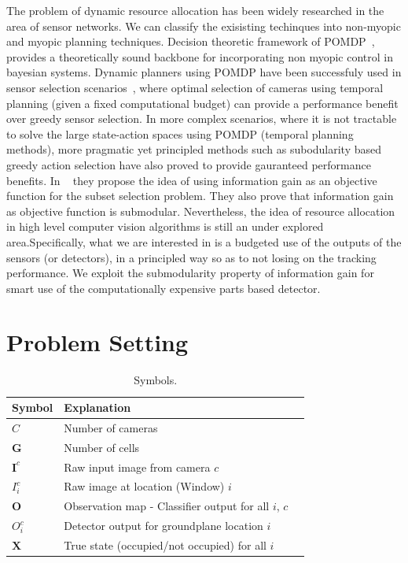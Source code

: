 \documentclass[10pt,twocolumn,letterpaper]{article}
\begin{document}
The problem of dynamic resource allocation has been widely researched in the area of sensor networks. We can classify the exisisting techinques into non-myopic and myopic planning techniques.  Decision theoretic framework of POMDP~\cite{Kaelbling98}, provides a theoretically sound backbone for incorporating non myopic control in bayesian systems. Dynamic planners using POMDP have been successfuly used in sensor selection scenarios~\cite{Spaan09}, where optimal selection of cameras using temporal planning (given a  fixed computational budget) can provide a performance benefit over greedy sensor selection. In more complex scenarios, where it is not tractable to solve the large state-action spaces using POMDP (temporal planning methods), more pragmatic yet principled methods such as subodularity based greedy action selection have also proved to provide gauranteed performance benefits. In ~\cite{krause2012near} they propose the idea of using information gain as an objective function for the subset selection problem. They also prove that information gain as objective function is submodular. Nevertheless, the idea of resource allocation in high level computer vision algorithms is still an under explored area.Specifically, what we are interested in is a budgeted use of the outputs of the sensors (or detectors), in a principled way so as to not losing on the tracking performance. We exploit the submodularity property of information gain for smart use of the computationally expensive parts based detector.


\section{Problem Setting}

\begin{table}[ht]
  \begin{tabular}{lll}
   \hline
   Symbol & Explanation \\
   \hline
   $C $ & Number of cameras\\
   $\textbf{G} $ & Number of cells\\
   $ \textbf{I}^{c} $ & Raw input image from camera $ c$\\
   $ I_{i}^{c} $ & Raw image at location (Window) $ i$\\
   $ \textbf{O} $ & Observation map - Classifier output for all  $ i $, $ c $\\
   $O^{c}_{i} $& Detector output for groundplane location $ i $\\
   $\textbf{X}$& True state (occupied/not occupied) for all $i$\\
   \hline
  \end{tabular}
  \caption{%
    Symbols.
  }
  \label{tab:Formal symbols}
\end{table}
\end{document}

